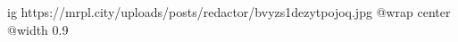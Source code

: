  
 
 
 
 

\ifcmt
  ig https://mrpl.city/uploads/posts/redactor/bvyzs1dezytpojoq.jpg
  @wrap center
  @width 0.9
\fi
